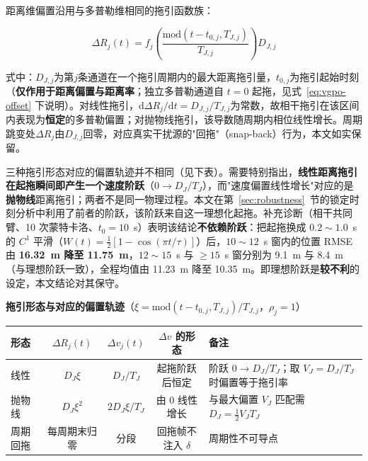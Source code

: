 \documentclass[UTF8,a4paper,zihao=-4]{ctexart}
\begin{document}
距离维偏置沿用与多普勒维相同的拖引函数族：


\begin{equation}
\Delta R_j(t)=f_j\!\left(\frac{\mathrm{mod}(t-t_{0,j},T_{J,j})}{T_{J,j}}\right)D_{J,j}
\label{eq:rgpo-range}
\end{equation}


式中：\(D_{J,j}\)为第\(j\)条通道在一个拖引周期内的最大距离拖引量，\(t_{0,j}\)为拖引起始时刻（\textbf{仅作用于距离偏置与距离率}；独立多普勒通道自 \(t=0\) 起拖，见式~\eqref{eq:vgpo-offset} 下说明）。对线性拖引，\(\mathrm{d}\Delta R_j/\mathrm{d}t=D_{J,j}/T_{J,j}\)为常数，故相干拖引在该区间内表现为\textbf{恒定}的多普勒偏置；对抛物线拖引，该导数随周期内相位线性增长。周期跳变处\(\Delta R_j\)由\(D_{J,j}\)回零，对应真实干扰源的"回拖"（snap-back）行为，本文如实保留。

三种拖引形态对应的偏置轨迹并不相同（见下表）。需要特别指出，\textbf{线性距离拖引在起拖瞬间即产生一个速度阶跃}（\(0\to D_J/T_J\)），而"速度偏置线性增长"对应的是\textbf{抛物线}距离拖引；两者不是同一物理过程。本文在第~\ref{sec:robustness}~节的锁定时刻分析中利用了前者的阶跃，该阶跃来自这一理想化起拖。补充诊断（相干共同臂、10 次蒙特卡洛、$t_0=10$~s）表明该结论\textbf{不依赖阶跃}：把起拖换成 $0.2\sim1.0$~s 的 $C^1$ 平滑（$W(t)=\tfrac12[1-\cos(\pi t/\tau)]$）后，$10\sim12$~s 窗内的位置 RMSE 由 \textbf{16.32~m 降至 11.75~m}，$12\sim15$~s 与 $\ge15$~s 窗分别为 9.1~m 与 8.4~m（与理想阶跃一致），全程均值由 11.23~m 降至 10.35~m。即理想阶跃是\textbf{较不利}的设定，本文结论对其保守。

\begin{center}
\small
\textbf{拖引形态与对应的偏置轨迹}（$\xi=\mathrm{mod}(t-t_{0,j},T_{J,j})/T_{J,j}$，$\rho_j=1$）\\[2pt]
\footnotesize
\begin{tabularx}{\textwidth}{@{}lcccX@{}}
\toprule
形态 & $\Delta R_j(t)$ & $\Delta v_j(t)$ & $\Delta v$ 的形态 & 备注 \\
\midrule
线性 & $D_J\xi$ & $D_J/T_J$ & 起拖阶跃后恒定 & 阶跃 $0\to D_J/T_J$；取 $V_J=D_J/T_J$ 时偏置等于拖引率 \\
抛物线 & $D_J\xi^2$ & $2D_J\xi/T_J$ & 由 0 线性增长 & 与最大偏置 $V_J$ 匹配需 $D_J=\frac12V_JT_J$ \\
周期回拖 & 每周期末归零 & 分段 & 回拖帧不注入 $\delta$ & 周期性不可导点 \\
\bottomrule
\end{tabularx}
\par\vspace{2pt}{\footnotesize 注：本文四个联合拖引臂均取线性形态（$D_J/T_J=50$~m/s、$t_0=10$~s）；抛物线形态只出现在纯 VGPO 臂（$\rho_j=0$，$D_J$ 不参与），故上表的匹配条件在本文实验中不被触发。}
\end{center}
\end{document}
